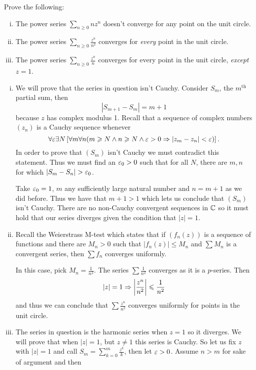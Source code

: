 \documentclass[12pt]{memoir}
\begin{document}
\begin{Ej}
    Prove the following:
    \begin{enumerate}[i)]
        \itemsep=-0.4em
        \item The power series $\sum_{n\geq 0}nz^n$ doesn't converge for any point on the unit circle.
        \item The power series $\sum_{n\geq 0}\frac{z^n}{n^2}$ converges for \emph{every} point in the unit circle.
        \item The power series $\sum_{n\geq 0}\frac{z^n}{n}$ converges for {every} point in the unit circle, \emph{except} $z=1$.
        \end{enumerate}
\end{Ej}

\begin{ptcbr}
    \begin{enumerate}[i)]
        \itemsep=-0.4em
        \item We will prove that the series in question isn't Cauchy. Consider $S_m$, the $m^{\text{th}}$ partial sum, then 
        $$|S_{m+1}-S_m|=m+1$$
        because $z$ has complex modulus 1. Recall that a sequence of complex numbers $(z_n)$ is a Cauchy sequence whenever %
        $$\forall \varepsilon \exists N\left[\forall m\forall n(m\geqslant N\land n\geqslant N\land \varepsilon>0\Rightarrow |z_m-z_n|<\varepsilon)\right].$$
        In order to prove that $(S_m)$ isn't Cauchy we must contradict this statement. Thus we must find an $\varepsilon_0>0$ such that for all $N$, there are $m,n$ for which $|S_m-S_n|>\eps_0$.\par 
        Take $\varepsilon_0=1$, $m$ any sufficiently large natural number and $n=m+1$ as we did before. Thus we have that $m+1>1$ which lets us conclude that $(S_m)$ isn't Cauchy. There are no non-Cauchy convergent sequences in $\mathbb{C}$ so it must hold that our series diverges given the condition that $|z|=1$. 
        \item Recall the Weierstrass M-test which states that if $(f_n(z))$ is a sequence of functions and there are $M_n>0$ such that $|f_n(z)|\leq M_n$ and $\sum M_n$ is a convergent series, then $\sum f_n$ converges uniformly.\par 
        In this case, pick $M_n=\frac{1}{n^2}$. The series $\sum \frac{1}{n^2}$ converges as it is a $p$-series. Then 
        $$|z|=1\Rightarrow\left|\frac{z^n}{n^2}\right|\leqslant\frac{1}{n^2}$$
        and thus we can conclude that $\sum\frac{z^n}{n^2}$ converges uniformly for points in the unit circle. 
        \item The series in question is the harmonic series when $z=1$ so it diverges. We will prove that when $|z|=1$, but $z\neq 1$ this series is Cauchy. So let us fix $z$ with $|z|=1$ and call $S_m=\sum_{k=0}^m\frac{z^k}{k}$, then let $\varepsilon>0$. Assume $n>m$ for sake of argument and then

\end{enumerate}
\end{ptcbr}
\end{document}
